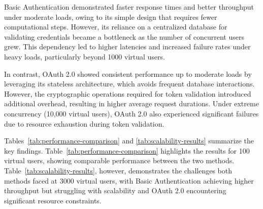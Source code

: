 Basic Authentication demonstrated faster response times and better throughput under moderate loads, owing to its simple design that requires fewer computational steps. However, its reliance on a centralized database for validating credentials became a bottleneck as the number of concurrent users grew. This dependency led to higher latencies and increased failure rates under heavy loads, particularly beyond 1000 virtual users.

In contrast, OAuth 2.0 showed consistent performance up to moderate loads by leveraging its stateless architecture, which avoids frequent database interactions. However, the cryptographic operations required for token validation introduced additional overhead, resulting in higher average request durations. Under extreme concurrency (10,000 virtual users), OAuth 2.0 also experienced significant failures due to resource exhaustion during token validation.

Tables~\ref{tab:performance-comparison} and \ref{tab:scalability-results} summarize the key findings. Table~\ref{tab:performance-comparison} highlights the results for 100 virtual users, showing comparable performance between the two methods. Table~\ref{tab:scalability-results}, however, demonstrates the challenges both methods faced at 3000 virtual users, with Basic Authentication achieving higher throughput but struggling with scalability and OAuth 2.0 encountering significant resource constraints.

